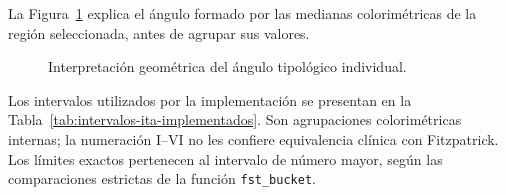 La Figura~\ref{fig:ita-esquema-geometrico} explica el ángulo formado por las medianas colorimétricas de la región seleccionada, antes de agrupar sus valores.

\begin{figure}[!htbp]
\caption{Interpretación geométrica del ángulo tipológico individual.}
\label{fig:ita-esquema-geometrico}
\centering

\par\smallskip
\raggedright\fontsize{11}{13}\selectfont
\par{}
\end{figure}


Los intervalos utilizados por la implementación se presentan en la Tabla~\ref{tab:intervalos-ita-implementados}. Son agrupaciones colorimétricas internas; la numeración I--VI no les confiere equivalencia clínica con Fitzpatrick. Los límites exactos pertenecen al intervalo de número mayor, según las comparaciones estrictas de la función \texttt{fst\_bucket}.

